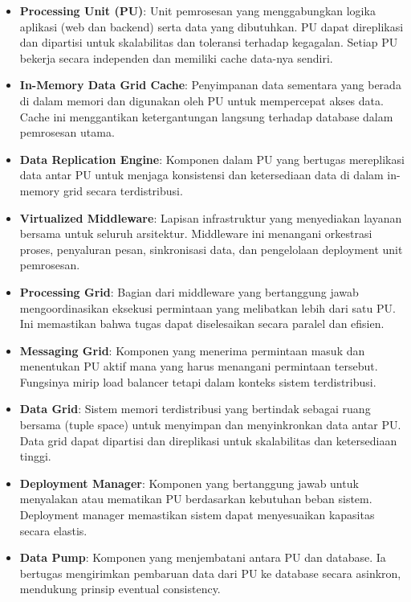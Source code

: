 \begin{itemize}
	\item \textbf{Processing Unit (PU)}: Unit pemrosesan yang menggabungkan logika aplikasi (web dan backend) serta data yang dibutuhkan. PU dapat direplikasi dan dipartisi untuk skalabilitas dan toleransi terhadap kegagalan. Setiap PU bekerja secara independen dan memiliki cache data-nya sendiri.
	
	\item \textbf{In-Memory Data Grid Cache}: Penyimpanan data sementara yang berada di dalam memori dan digunakan oleh PU untuk mempercepat akses data. Cache ini menggantikan ketergantungan langsung terhadap database dalam pemrosesan utama.
	
	\item \textbf{Data Replication Engine}: Komponen dalam PU yang bertugas mereplikasi data antar PU untuk menjaga konsistensi dan ketersediaan data di dalam in-memory grid secara terdistribusi.
	
	\item \textbf{Virtualized Middleware}: Lapisan infrastruktur yang menyediakan layanan bersama untuk seluruh arsitektur. Middleware ini menangani orkestrasi proses, penyaluran pesan, sinkronisasi data, dan pengelolaan deployment unit pemrosesan.
	
	\item \textbf{Processing Grid}: Bagian dari middleware yang bertanggung jawab mengoordinasikan eksekusi permintaan yang melibatkan lebih dari satu PU. Ini memastikan bahwa tugas dapat diselesaikan secara paralel dan efisien.
	
	\item \textbf{Messaging Grid}: Komponen yang menerima permintaan masuk dan menentukan PU aktif mana yang harus menangani permintaan tersebut. Fungsinya mirip load balancer tetapi dalam konteks sistem terdistribusi.
	
	\item \textbf{Data Grid}: Sistem memori terdistribusi yang bertindak sebagai ruang bersama (tuple space) untuk menyimpan dan menyinkronkan data antar PU. Data grid dapat dipartisi dan direplikasi untuk skalabilitas dan ketersediaan tinggi.
	
	\item \textbf{Deployment Manager}: Komponen yang bertanggung jawab untuk menyalakan atau mematikan PU berdasarkan kebutuhan beban sistem. Deployment manager memastikan sistem dapat menyesuaikan kapasitas secara elastis.
	
	\item \textbf{Data Pump}: Komponen yang menjembatani antara PU dan database. Ia bertugas mengirimkan pembaruan data dari PU ke database secara asinkron, mendukung prinsip eventual consistency.
	

\end{itemize}
